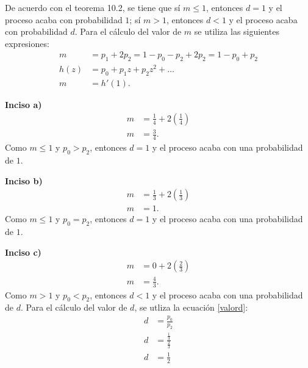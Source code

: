 \documentclass{article}
\begin{document}
De acuerdo con el teorema 10.2, se tiene que sí $m \leq 1$, entonces $d=1$ y el proceso acaba con probabilidad $1$; sí $m > 1$, entonces $d < 1$ y el proceso acaba con probabilidad $d$. Para el cálculo del valor de $m$ se utiliza las siguientes expresiones:
\begin{align}
    \nonumber
    m & = p_{1}+2p_{2} = 1-p_{0}-p_{2}+2p_{2} = 1-p_{0}+p_{2} \\ \nonumber
    h(z) & = p_{0} + p_{1}z + p_{2}z^2 + \dots \\ \nonumber
    m & = h'(1). \nonumber
\end{align}

\noindent \textbf{Inciso a)}
\begin{align}
    \nonumber
        m & = \frac{1}{4} + 2\left(\frac{1}{4}\right) \\ \nonumber
        m & = \frac{3}{4}. \nonumber
\end{align}
Como $m \leq 1$ y $p_{0} > p_{2}$, entonces $d=1$ y el proceso acaba con una probabilidad de $1$.

\noindent \textbf{Inciso b)}
\begin{align}
    \nonumber
        m & = \frac{1}{3} + 2\left(\frac{1}{3}\right) \\ \nonumber
        m & = 1. \nonumber
\end{align}
Como $m \leq 1$ y $p_{0} = p_{2}$, entonces $d=1$ y el proceso acaba con una probabilidad de $1$.

\noindent \textbf{Inciso c)}
\begin{align}
    \nonumber
        m & = 0 + 2\left(\frac{2}{3}\right) \\ \nonumber
        m & = \frac{4}{3}. \nonumber
\end{align}
Como $m > 1$ y $p_{0} < p_{2}$, entonces $d<1$ y el proceso acaba con una probabilidad de $d$. Para el cálculo del valor de $d$, se utliza la ecuación \ref{valord}:
\begin{align} \label{valord}
        d & = \frac{p_{0}}{p_{2}}\\ \nonumber
        d & = \frac{\frac{1}{3}}{\frac{2}{3}}\\ \nonumber
        d & = \frac{1}{2} \\ \nonumber
\end{align}
\end{document}
